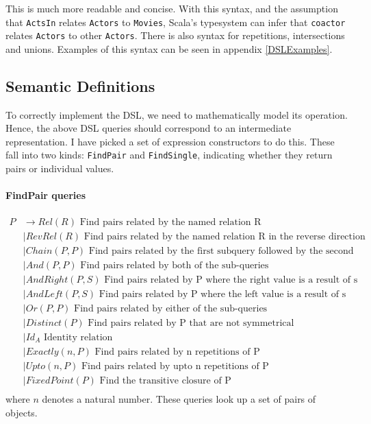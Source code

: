\documentclass[12pt,a4paper,twoside,openright]{report}
\newcommand\codeName[1]{\texttt{#1}}
\begin{document}
This is much more readable and concise. With this syntax, and the assumption that \codeName{ActsIn} relates \codeName{Actors} to \codeName{Movies}, Scala's typesystem can infer that \codeName{coactor} relates \codeName{Actors} to other \codeName{Actors}. There is also syntax for repetitions, intersections and unions. Examples of this syntax can be seen in appendix \ref{DSLExamples}.
\subsection{Semantic Definitions}\label{ADTDef}
To correctly implement the DSL, we need to mathematically model its operation. Hence, the above DSL queries should correspond to an intermediate representation. I have picked a set of expression constructors to do this. These fall into two kinds: \codeName{FindPair} and \codeName{FindSingle}, indicating whether they return pairs or individual values.

\paragraph{FindPair queries}
\begin{equation}
\label{PDefinition}
\begin{split}
P  &\rightarrow Rel(R) \mbox{ Find pairs related by the named relation R}\\
&\mid RevRel(R) \mbox{ Find pairs related by the named relation R in the reverse direction}\\
&\mid Chain(P, P) \mbox{   Find pairs related by the first subquery followed by the second}\\
&\mid And(P, P) \mbox{  Find pairs related by both of the sub-queries}\\
&\mid AndRight(P, S) \mbox{  Find pairs related by P where the right value is a result of s}\\
&\mid AndLeft(P, S) \mbox{  Find pairs related by P where the left value is a result of s}\\
&\mid Or(P, P) \mbox{  Find pairs related by either of the sub-queries}\\
&\mid Distinct(P) \mbox{  Find pairs related by P that are not symmetrical}\\
&\mid Id_A \mbox{ Identity relation}\\
&\mid Exactly(\mathit{n}, P) \mbox{  Find pairs related by n repetitions of P}\\
&\mid Upto(\mathit{n}, P) \mbox{  Find pairs related by upto n repetitions of P}\\
&\mid FixedPoint(P) \mbox{  Find the transitive closure of P}\\
\end{split}
\end{equation} 
where $n$ denotes a natural number. These queries look up a set of pairs of objects.\\
\end{document}
